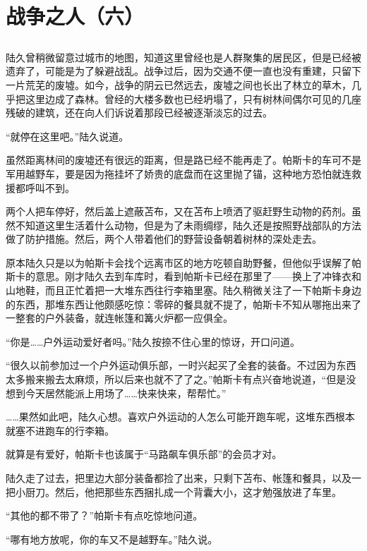 \chapter{战争之人（六）}


\section*{}

陆久曾稍微留意过城市的地图，知道这里曾经也是人群聚集的居民区，但是已经被遗弃了，可能是为了躲避战乱。战争过后，因为交通不便一直也没有重建，只留下一片荒芜的废墟。如今，战争的阴云已然远去，废墟之间也长出了林立的草木，几乎把这里边成了森林。曾经的大楼多数也已经坍塌了，只有树林间偶尔可见的几座残破的建筑，还在向人们诉说着那段已经被逐渐淡忘的过去。

“就停在这里吧。”陆久说道。

虽然距离林间的废墟还有很远的距离，但是路已经不能再走了。帕斯卡的车可不是军用越野车，要是因为拖挂坏了娇贵的底盘而在这里抛了锚，这种地方恐怕就连救援都呼叫不到。

两个人把车停好，然后盖上遮蔽苫布，又在苫布上喷洒了驱赶野生动物的药剂。虽然不知道这里生活着什么动物，但是为了未雨绸缪，陆久还是按照野战部队的方法做了防护措施。然后，两个人带着他们的野营设备朝着树林的深处走去。

原本陆久只是以为帕斯卡会找个远离市区的地方吃顿自助野餐，但他似乎误解了帕斯卡的意思。刚才陆久去到车库时，看到帕斯卡已经在那里了——换上了冲锋衣和山地鞋，而且正忙着把一大堆东西往行李箱里塞。陆久稍微关注了一下帕斯卡身边的东西，那堆东西让他颇感吃惊：零碎的餐具就不提了，帕斯卡不知从哪拖出来了一整套的户外装备，就连帐篷和篝火炉都一应俱全。

“你是……户外运动爱好者吗。”陆久按捺不住心里的惊讶，开口问道。

“很久以前参加过一个户外运动俱乐部，一时兴起买了全套的装备。不过因为东西太多搬来搬去太麻烦，所以后来也就不了了之。”帕斯卡有点兴奋地说道，“但是没想到今天居然能派上用场了……快来快来，帮帮忙。”

……果然如此吧，陆久心想。喜欢户外运动的人怎么可能开跑车呢，这堆东西根本就塞不进跑车的行李箱。

就算是有爱好，帕斯卡也该属于“马路飙车俱乐部”的会员才对。

陆久走了过去，把里边大部分装备都捡了出来，只剩下苫布、帐篷和餐具，以及一把小厨刀。然后，他把那些东西捆扎成一个背囊大小，这才勉强放进了车里。

“其他的都不带了？”帕斯卡有点吃惊地问道。

“哪有地方放呢，你的车又不是越野车。”陆久说。


